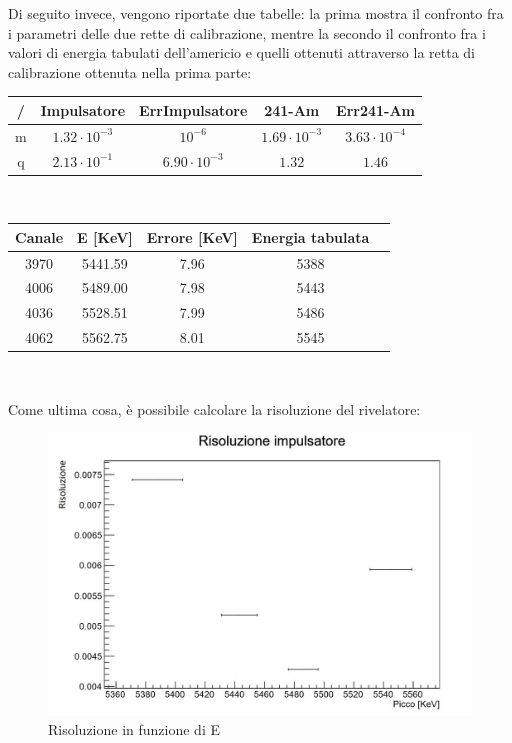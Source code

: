 \documentclass[a4paper,10pt]{article}
\begin{document}
Di seguito invece, vengono riportate due tabelle: la prima mostra il confronto fra i parametri delle due rette di calibrazione, mentre la secondo il confronto fra i valori di energia tabulati dell'americio e quelli ottenuti attraverso la retta di calibrazione ottenuta nella prima parte:\\

\begin{center}
\begin{tabular}{ccccc}
\toprule
/ & Impulsatore & ErrImpulsatore & 241-Am & Err241-Am\\
\midrule
m & $1.32\cdot10^{-3}$ & $10^{-6}$ & $1.69\cdot10^{-3}$ & $3.63\cdot10^{-4}$\\
q & $2.13\cdot10^{-1}$ & $6.90\cdot10^{-3}$ & $1.32$ & $1.46$\\
\bottomrule
\end{tabular}\\
\end{center}
\begin{center}
\begin{tabular}{ccccc}
\toprule
Canale & E [KeV] & Errore [KeV] & Energia tabulata\\
\midrule
3970 & 5441.59 & 7.96 & 5388\\
4006 & 5489.00 & 7.98 & 5443\\
4036 & 5528.51 & 7.99 & 5486\\
4062 & 5562.75 & 8.01 & 5545\\
\bottomrule
\end{tabular}\\
\end{center}

Come ultima cosa, \`e possibile calcolare la risoluzione del rivelatore:\\

\begin{figure}[H]
\centering
\includegraphics[scale=0.5]{risoluzione.jpg}
\caption{Risoluzione in funzione di E}
\end{figure}
\end{document}
